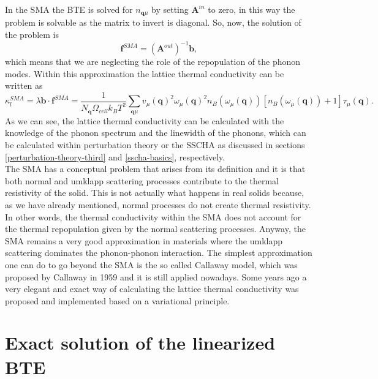 In the SMA the BTE is solved for $n_{\mathbf{q}\mu}$ by setting $\mathbf{A}^{in}$ to zero, in this way the problem is solvable as the matrix to invert is diagonal. So, now, the solution of the problem is
\begin{equation}
 \mathbf{f}^{SMA}=(\mathbf{A}^{out})^{-1}\mathbf{b},
\end{equation}
which means that we are neglecting the role of the repopulation of the phonon modes. Within this approximation the lattice thermal conductivity can be written as
\begin{equation}
 \kappa_{l}^{SMA}=\lambda\mathbf{b}\cdot\mathbf{f}^{SMA}=\frac{1}{N_{\mathbf{q}}\Omega_{cell} k_{B}T^{2}}\sum_{\mathbf{q}\mu}v_{\mu}(\mathbf{q})^{2}\omega_{\mu}(\mathbf{q})^{2}n_{B}(\omega_{\mu}(\mathbf{q}))[n_{B}(\omega_{\mu}(
 \mathbf{q}))+1]\tau_{\mu}(\mathbf{q}).
\end{equation}
As we can see, the lattice thermal conductivity can be calculated with the knowledge of the phonon spectrum and the linewidth of the phonons, which can be calculated within perturbation theory or the SSCHA as discussed 
in sections \ref{perturbation-theory-third} and \ref{sscha-basics}, respectively. \\

The SMA has a conceptual problem that arises from its definition and it is that both normal and umklapp scattering processes contribute to the thermal 
resistivity of the solid. This is not actually what happens in real solids because, as we have already mentioned, normal processes do not create thermal resistivity. In other words, the thermal conductivity within the SMA does not 
account for the thermal repopulation given by the normal scattering processes. Anyway, the SMA remains a very good approximation in materials where the umklapp scattering dominates the phonon-phonon interaction. The simplest 
approximation one can do to go beyond the SMA is the so called Callaway model\cite{callaway1959model}, which was proposed by Callaway in 1959 and it is still applied nowadays. Some years ago a very elegant and exact way of 
calculating the lattice thermal conductivity was proposed\cite{fugallo2013ab} and implemented based on a variational principle. \\

\section{Exact solution of the linearized BTE}

